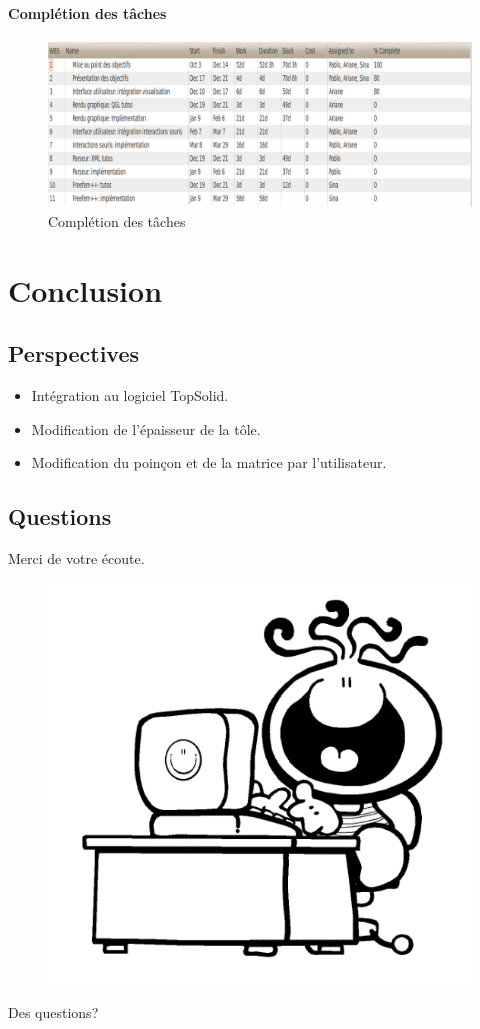 \documentclass{beamer}
\begin{document}
\begin{frame}
    \framesubtitle{Complétion des tâches}
    \begin{figure}
        \includegraphics[width=\textwidth]{img/ganttCompletionTasks.png}
        \caption{Complétion des tâches}
        \label{Complétion}
    \end{figure}
\end{frame}

\section{Conclusion}
\subsection{Perspectives}
\begin{frame}
    \begin{itemize}
        \item Intégration au logiciel TopSolid.
        \item Modification de l'épaisseur de la tôle.
        \item Modification du poinçon et de la matrice par l'utilisateur.
    \end{itemize}
\end{frame}
\subsection{Questions}
\begin{frame}
    Merci de votre écoute.
    \begin{figure}
        \includegraphics[width=.55\textwidth]{img/conclusion.png}
        \label{Conclusion}
    \end{figure}
    \hfill Des questions?
\end{frame}
\end{document}
